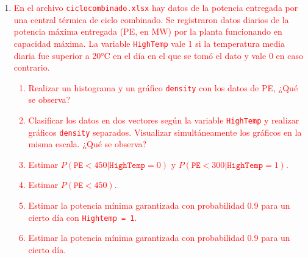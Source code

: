 \documentclass[12pt]{article}%
\begin{document}
\begin{enumerate}
\item \textcolor{red}{ En el archivo \texttt{ciclocombinado.xlsx} hay datos de la potencia entregada por una central térmica de ciclo combinado. Se registraron datos diarios de la potencia máxima entregada (PE, en MW) por la planta funcionando en capacidad máxima. La variable \texttt{HighTemp} vale 1 si la temperatura media diaria fue superior a 20°C en el día en el que se tomó el dato y vale 0 en caso contrario.
\begin{enumerate}
    \item Realizar un histograma y un gráfico \texttt{density} con los datos de PE, ¿Qué se observa? 
    \item Clasificar los datos en dos vectores según la variable \texttt{HighTemp} y realizar gráficos \texttt{density} separados. Visualizar simultáneamente los gráficos en la misma escala.  ¿Qué se observa?
    \item Estimar $P(\texttt{PE} < 450 | \texttt{HighTemp} = 0)$ y $P(\texttt{PE} < 300 | \texttt{HighTemp} = 1)$.
    \item Estimar $P(\texttt{PE} < 450 )$.
    \item Estimar la potencia mínima garantizada con probabilidad 0.9 para un cierto día con \texttt{Hightemp = 1}.
    \item Estimar la potencia mínima garantizada con probabilidad 0.9 para un cierto día.
\end{enumerate}}


\end{enumerate}
\end{document}
